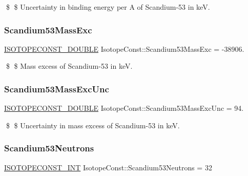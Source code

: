 \$ \$ Uncertainty in binding energy per A of Scandium-\/53 in keV. \mbox{\label{group___isotope_const-_scandium-_sc53_gac8ce3cd76824d3435c18901d16b0dded}} 
\subsubsection{\texorpdfstring{Scandium53\+Mass\+Exc}{Scandium53MassExc}}
{\footnotesize\ttfamily \mbox{\hyperlink{group___isotope_const-_macros_ga8f45a7272ce02c0b4c65c44636ed719a}{I\+S\+O\+T\+O\+P\+E\+C\+O\+N\+S\+T\+\_\+\+D\+O\+U\+B\+LE}} Isotope\+Const\+::\+Scandium53\+Mass\+Exc = -\/38906.}

\$ \$ Mass excess of Scandium-\/53 in keV. \mbox{\label{group___isotope_const-_scandium-_sc53_ga0334fd9b0a05a20b013446ac58de66b2}} 
\subsubsection{\texorpdfstring{Scandium53\+Mass\+Exc\+Unc}{Scandium53MassExcUnc}}
{\footnotesize\ttfamily \mbox{\hyperlink{group___isotope_const-_macros_ga8f45a7272ce02c0b4c65c44636ed719a}{I\+S\+O\+T\+O\+P\+E\+C\+O\+N\+S\+T\+\_\+\+D\+O\+U\+B\+LE}} Isotope\+Const\+::\+Scandium53\+Mass\+Exc\+Unc = 94.}

\$ \$ Uncertainty in mass excess of Scandium-\/53 in keV. \mbox{\label{group___isotope_const-_scandium-_sc53_gab5e5ebf742e9b94204028d866c14fe79}} 
\subsubsection{\texorpdfstring{Scandium53\+Neutrons}{Scandium53Neutrons}}
{\footnotesize\ttfamily \mbox{\hyperlink{group___isotope_const-_macros_ga5f18360b3e99483a35c32d789e62621c}{I\+S\+O\+T\+O\+P\+E\+C\+O\+N\+S\+T\+\_\+\+I\+NT}} Isotope\+Const\+::\+Scandium53\+Neutrons = 32}

